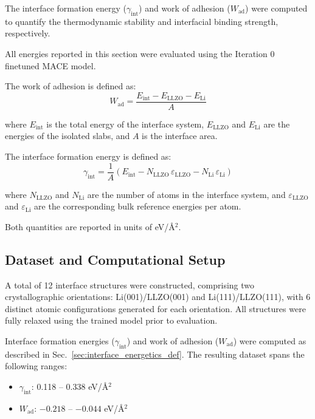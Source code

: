 \documentclass[12pt,a4paper,oneside]{book}
\newcommand{\secref}[1]{Sec.~\ref{#1}}
\begin{document}
The interface formation energy ($\gamma_{\mathrm{int}}$) and work of adhesion ($W_{\mathrm{ad}}$) were computed to quantify the thermodynamic stability and interfacial binding strength, respectively.

All energies reported in this section were evaluated using the Iteration 0 finetuned MACE model.

The work of adhesion is defined as:
\begin{equation}
W_{\mathrm{ad}} = \frac{E_{\mathrm{int}} - E_{\mathrm{LLZO}} - E_{\mathrm{Li}}}{A}
\end{equation}

where $E_{\mathrm{int}}$ is the total energy of the interface system, $E_{\mathrm{LLZO}}$ and $E_{\mathrm{Li}}$ are the energies of the isolated slabs, and $A$ is the interface area.

The interface formation energy is defined as:
\begin{equation}
\gamma_{\mathrm{int}} = \frac{1}{A}\!\left(E_{\mathrm{int}} - N_{\mathrm{LLZO}} \, \varepsilon_{\mathrm{LLZO}} - N_{\mathrm{Li}} \, \varepsilon_{\mathrm{Li}}\right)
\end{equation}

where $N_{\mathrm{LLZO}}$ and $N_{\mathrm{Li}}$ are the number of atoms in the interface system, and $\varepsilon_{\mathrm{LLZO}}$ and $\varepsilon_{\mathrm{Li}}$ are the corresponding bulk reference energies per atom.

Both quantities are reported in units of eV/\AA$^2$.

\subsection{Dataset and Computational Setup}

A total of 12 interface structures were constructed, comprising two crystallographic orientations: Li(001)/LLZO(001) and Li(111)/LLZO(111), with 6 distinct atomic configurations generated for each orientation. All structures were fully relaxed using the trained model prior to evaluation.

Interface formation energies ($\gamma_{\mathrm{int}}$) and work of adhesion ($W_{\mathrm{ad}}$) were computed as described in \secref{sec:interface_energetics_def}. The resulting dataset spans the following ranges:

\begin{itemize}
    \item $\gamma_{\mathrm{int}}$: 0.118 -- 0.338 eV/\AA$^2$
    \item $W_{\mathrm{ad}}$: $-0.218$ -- $-0.044$ eV/\AA$^2$
\end{itemize}
\end{document}
